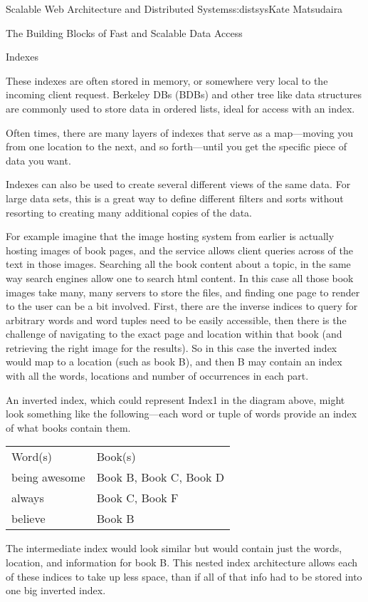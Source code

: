 \begin{aosachapter}{Scalable Web Architecture and Distributed Systems}{s:distsys}{Kate Matsudaira}
\begin{aosasect1}{The Building Blocks of Fast and Scalable Data Access}
\begin{aosasect2}{Indexes}

These indexes are often stored in memory, or somewhere very local to
the incoming client request. Berkeley DBs (BDBs) and other tree like
data structures are commonly used to store data in ordered lists,
ideal for access with an index.

Often times, there are many layers of indexes that serve as a
map---moving you from one location to the next, and so forth---until
you get the specific piece of data you want.


Indexes can also be used to create several different views of the same
data. For large data sets, this is a great way to define different
filters and sorts without resorting to creating many additional copies
of the data.

For example imagine that the image hosting system from earlier is
actually hosting images of book pages, and the service allows client
queries across of the text in those images. Searching all the book
content about a topic, in the same way search engines allow one to
search html content. In this case all those book images take many,
many servers to store the files, and finding one page to render to the
user can be a bit involved. First, there are the inverse indices to
query for arbitrary words and word tuples need to be easily
accessible, then there is the challenge of navigating to the exact
page and location within that book (and retrieving the right image for
the results). So in this case the inverted index would map to a
location (such as book B), and then B may contain an index with all
the words, locations and number of occurrences in each part.

An inverted index, which could represent Index1 in the diagram above,
might look something like the following---each word or tuple of words
provide an index of what books contain them.

\begin{tabular}{ll}
Word(s) & Book(s) \\
being awesome & Book B, Book C, Book D \\
always & Book C, Book F \\
believe & Book B \\
\end{tabular}

The intermediate index would look similar but would contain just the
words, location, and information for book B. This nested index
architecture allows each of these indices to take up less space, than
if all of that info had to be stored into one big inverted index.


\end{aosasect2}
\end{aosasect1}
\end{aosachapter}
